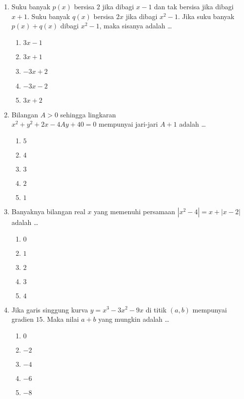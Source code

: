 \documentclass[A4,12PT, english, twocolumn]{journal}
\begin{document}
\begin{enumerate}
\item Suku banyak $p(x)$ bersisa $2$ jika dibagi $x-1$ dan tak bersisa jika dibagi $x+1$. Suku banyak $q(x)$ bersisa $2x$ jika dibagi $x^2-1$. Jika suku banyak $p(x)+q(x)$ dibagi $x^2-1$, maka sisanya adalah \dots
    \begin{enumerate}
        \item $3x-1$
        \item $3x+1$
        \item $-3x+2$
        \item $-3x-2$
        \item $3x+2$
    \end{enumerate}
    
\item Bilangan $A>0$ sehingga lingkaran \\ $x^2+y^2+2x-4Ay+40=0$ mempunyai jari-jari $A+1$ adalah \dots
    \begin{enumerate}
        \item $5$
        \item $4$
        \item $3$
        \item $2$
        \item $1$
    \end{enumerate}

\item Banyaknya bilangan real $x$ yang memenuhi persamaan $\left|x^2-4 \right| = x+ \left|x-2 \right|$ adalah \dots
    \begin{enumerate}
        \item $0$
        \item $1$
        \item $2$
        \item $3$
        \item $4$
    \end{enumerate}

\item Jika garis singgung kurva $y=x^3-3x^2-9x$ di titik $\left(a,b \right)$ mempunyai gradien $15$. Maka nilai $a+b$ yang mungkin adalah \dots
\begin{enumerate}
       \item $0$
       \item $-2$
       \item $-4$
       \item $-6$
       \item $-8$
    \end{enumerate}
    


\end{enumerate}
\end{document}
